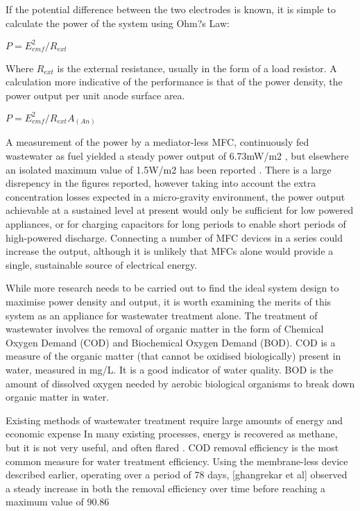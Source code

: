 \documentclass[12pt]{article}
\begin{document}
If the potential difference between the two electrodes is known, it is simple to calculate the power of the system using Ohm?s Law:

$P = E_{emf} ^{2} / R_{ext}$

Where $R_{ext}$ is the external resistance, usually in the form of a load resistor. A calculation more indicative of the performance is that of the power density, the power output per unit anode surface area.

$P = E_{emf} ^{2} / R_{ext} A_(An)$

A measurement of the power by a mediator-less MFC, continuously fed wastewater as fuel yielded a steady power output of 6.73mW/m2 \cite{ghangrekar2006microbial}, but elsewhere an isolated maximum value of 1.5W/m2 has been reported \cite{logan2008microbial}. There is a large disrepency in the figures reported, however taking into account the extra concentration losses expected in a micro-gravity environment, the power output achievable at a sustained level at present would only be sufficient for low powered appliances, or for charging capacitors for long periods to enable short periods of high-powered discharge. Connecting a number of MFC devices in a series could increase the output, although it is unlikely that MFCs alone would provide a single, sustainable source of electrical energy.

While more research needs to be carried out to find the ideal system design to maximise power density and output, it is worth examining the merits of this system as an appliance for wastewater treatment alone. The treatment of wastewater involves the removal of organic matter in the form of Chemical Oxygen Demand (COD) and Biochemical Oxygen Demand (BOD). COD is a measure of the organic matter (that cannot be oxidised biologically) present in water, measured in mg/L. It is a good indicator of water quality. BOD is the amount of dissolved oxygen needed by aerobic biological organisms to break down organic matter in water. \cite{surez2005determination} 

Existing methods of wastewater treatment require large amounts of energy and economic expense In many existing processes, energy is recovered as methane, but it is not very useful, and often flared \cite{ghangrekar2006wastewater,chang2005improvement}. COD removal efficiency is the most common measure for water treatment efficiency. Using the membrane-less device described earlier, operating over a period of 78 days, [ghangrekar et al] observed a steady increase in both the removal efficiency over time before reaching a maximum value of 90.86%
\end{document}
